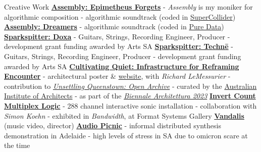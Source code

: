 \begin{rubric}{Creative Work}
      \entry*[2019]
         \href{https://thiswaterfallisyours.bandcamp.com/album/epimetheus-forgets}{\textbf{Assembly: Epimetheus Forgets}} 
         \entry* - \textit{Assembly} is my moniker for algorithmic composition
         \entry* - algorithmic soundtrack (coded in \href{https://supercollider.github.io/}{SuperCollider})
      \entry*[2015]
         \href{https://thiswaterfallisyours.bandcamp.com/album/dreamers}{\textbf{Assembly: Dreamers}}
         \entry* - algorithmic soundtrack (coded in \href{https://puredata.info/}{Pure Data})
      \entry*[2015]
         \href{https://sparkspitter.bandcamp.com/album/doxa}{\textbf{Sparkspitter: Doxa}}
         \entry* - Guitars, Strings, Recording Engineer, Producer
         \entry* - development grant funding awarded by Arts SA
      \entry*[2014]
         \href{https://sparkspitter.bandcamp.com/album/techn}{\textbf{Sparkspitter: Technē}}
         \entry* - Guitars, Strings, Recording Engineer, Producer
         \entry* - development grant funding awarded by Arts SA
      \entry*[2023]
         \href{https://unsettlingqueenstown.org/openarchive/cultivating-quiet/}{\textbf{Cultivating Quiet: Infrastructure for Reframing Encounter}}
         \entry* - architectural poster \& \href{https://cultivatingquiet.space/}{website}, with \textit{Richard LeMessurier}
         \entry* - contribution to \href{https://unsettlingqueenstown.org/}{\textit{Unsettling Queenstown: Open Archive}}
         \entry* - curated by the \href{https://www.architecture.com.au/venice-biennale}{Australian Institute of Architects}
         \entry* - as part of the \href{https://www.labiennale.org/en/architecture/2023}{\textit{Biennale Architettura 2023}}
      \entry*[2017]
         \href{https://youtu.be/596zUpXyG9g}{\textbf{Invert Count Multiplex Logic}}
         \entry* - 288 channel interactive sonic installation
         \entry* - collaboration with \textit{Simon Koehn}
         \entry* - exhibited in \textit{Bandwidth}, at Format Systems Gallery
      \entry*[2014]
         \href{https://vimeo.com/96894214}{\textbf{Vandalis}} (music video, director)
      \entry*[2022]
         \href{https://youtu.be/gg9udLivhFA}{\textbf{Audio Picnic}}
         \entry* - informal distributed synthesis demonstration in Adelaide
         \entry* - high levels of stress in SA due to omicron scare at the time
      \entry*[2022]

\end{rubric}
